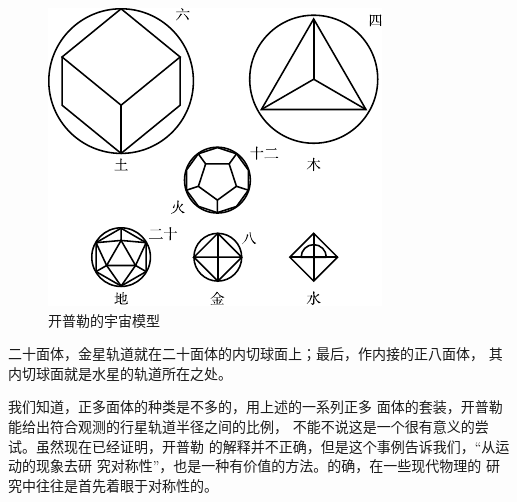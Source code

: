 \begin{figure}[h]
  \centering
  \includegraphics{figure/fig04.02b}
  \caption{开普勒的宇宙模型}
  \label{fig:04.02}
\end{figure}%
二十面体，金星轨道就在二十面体的内切球面上；最后，作内接的正八面体，
其内切球面就是水星的轨道所在之处。

我们知道，正多面体的种类是不多的，用上述的一系列正多
面体的套装，开普勒能给出符合观测的行星轨道半径之间的比例，
不能不说这是一个很有意义的尝试。虽然现在已经证明，开普勒
的解释并不正确，但是这个事例告诉我们，“从运动的现象去研
究对称性”，也是一种有价值的方法。的确，在一些现代物理的
研究中往往是首先着眼于对称性的。


